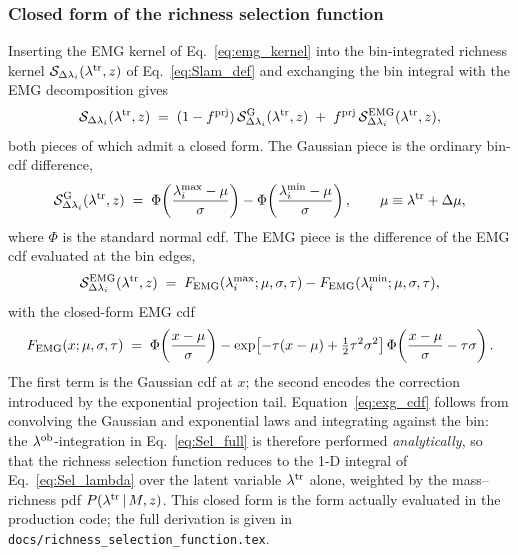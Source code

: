 \documentclass[a4paper, 11pt]{article}
\newcommand{\lob}{\lambda^{\rm ob}}
\newcommand{\ltr}{\lambda^{\rm tr}}
\begin{document}
\subsubsection{Closed form of the richness selection function}
\label{sec:richness:closedform}

Inserting the EMG kernel of Eq.~\eqref{eq:emg_kernel} into the
bin-integrated richness kernel $\mathcal{S}_{\Delta\lambda_i}(\ltr,z)$
of Eq.~\eqref{eq:Slam_def} and exchanging the bin integral with the
EMG decomposition gives
\begin{equation}
\mathcal{S}_{\Delta\lambda_i}(\ltr,z) \;=\;
(1-f^{\rm prj})\,\mathcal{S}_{\Delta\lambda_i}^{\rm G}(\ltr,z)
\;+\;
f^{\rm prj}\,\mathcal{S}_{\Delta\lambda_i}^{\rm EMG}(\ltr,z) ,
\label{eq:Slam_split}
\end{equation}
both pieces of which admit a closed form.  The Gaussian piece is the
ordinary bin-cdf difference,
\begin{equation}
\mathcal{S}_{\Delta\lambda_i}^{\rm G}(\ltr,z) \;=\;
\Phi\!\left(\frac{\lambda_i^{\max}-\mu}{\sigma}\right)
- \Phi\!\left(\frac{\lambda_i^{\min}-\mu}{\sigma}\right) ,
\qquad \mu \equiv \ltr+\Delta\mu ,
\label{eq:SlamG}
\end{equation}
where $\Phi$ is the standard normal cdf.  The EMG piece is the
difference of the EMG cdf evaluated at the bin edges,
\begin{equation}
\mathcal{S}_{\Delta\lambda_i}^{\rm EMG}(\ltr,z) \;=\;
F_{\rm EMG}(\lambda_i^{\max};\mu,\sigma,\tau)
- F_{\rm EMG}(\lambda_i^{\min};\mu,\sigma,\tau) ,
\label{eq:SlamEMG}
\end{equation}
with the closed-form EMG cdf
\begin{equation}
F_{\rm EMG}(x;\mu,\sigma,\tau) \;=\;
\Phi\!\left(\frac{x-\mu}{\sigma}\right)
- \exp\!\left[-\tau(x-\mu)+\tfrac{1}{2}\tau^{2}\sigma^{2}\right]
  \Phi\!\left(\frac{x-\mu}{\sigma}-\tau\sigma\right) .
\label{eq:exg_cdf}
\end{equation}
The first term is the Gaussian cdf at $x$; the second encodes the
correction introduced by the exponential projection tail.
Equation~\eqref{eq:exg_cdf} follows from convolving the Gaussian and
exponential laws and integrating against the bin: the
$\lob$-integration in Eq.~\eqref{eq:Sel_full} is therefore performed
\emph{analytically}, so that the richness selection function reduces
to the 1-D integral of Eq.~\eqref{eq:Sel_lambda} over the latent
variable $\ltr$ alone, weighted by the mass--richness pdf
$P(\ltr\,|\,M,z)$.  This closed form is the form actually evaluated in
the production code; the full derivation is given in
\texttt{docs/richness\_selection\_function.tex}.
\end{document}
